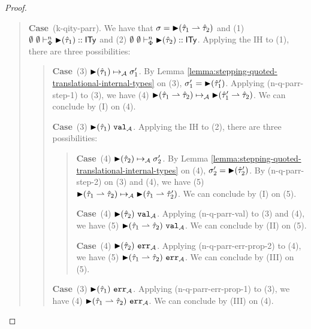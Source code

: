 \documentclass[12pt]{article}
\newcommand{\pfcase}[1]{\textbf{Case}~#1. }
\begin{document}
\begin{proof}
\begin{quote}
    \pfcase{(k-qity-parr)} We have that $\sigma={\blacktriangleright}(\hat{\tau}_1 \rightharpoonup \hat{\tau}_2)$ and (1) $\emptyset~\emptyset \vdash_{\Phi}^{n} {\blacktriangleright}(\hat{\tau}_1) :: {\sf ITy}$ and (2) $\emptyset~\emptyset \vdash_{\Phi}^{n} {\blacktriangleright}(\hat{\tau}_2) :: {\sf ITy}$. Applying the IH to (1), there are three possibilities:

    \begin{quote}
        \pfcase{(3) ${\blacktriangleright}(\hat{\tau}_1) \mapsto_{\mathcal{A}} \sigma_1'$} By Lemma \ref{lemma:stepping-quoted-translational-internal-types} on (3), $\sigma_1'={\blacktriangleright}(\hat{\tau}_1')$. Applying (n-q-parr-step-1) to (3), we have (4) ${\blacktriangleright}(\hat{\tau}_1 \rightharpoonup \hat{\tau}_2) \mapsto_{\mathcal{A}} {\blacktriangleright}(\hat{\tau}_1' \rightharpoonup \hat{\tau}_2)$. We can conclude by (I) on (4).

        \pfcase{(3) ${\blacktriangleright}(\hat{\tau}_1)~\mathtt{val}_{\mathcal{A}}$} Applying the IH to (2), there are three possibilities:

        \begin{quote}
            \pfcase{(4) ${\blacktriangleright}(\hat{\tau}_2) \mapsto_{\mathcal{A}} \sigma_2'$} By Lemma \ref{lemma:stepping-quoted-translational-internal-types} on (4), $\sigma_2'={\blacktriangleright}(\hat{\tau}_2')$. By (n-q-parr-step-2) on (3) and (4), we have (5) ${\blacktriangleright}(\hat{\tau}_1 \rightharpoonup \hat{\tau}_2) \mapsto_{\mathcal{A}} {\blacktriangleright}(\hat{\tau}_1 \rightharpoonup \hat{\tau}_2')$. We can conclude by (I) on (5).

            \pfcase{(4) ${\blacktriangleright}(\hat{\tau}_2)~\mathtt{val}_{\mathcal{A}}$} Applying (n-q-parr-val) to (3) and (4), we have (5) ${\blacktriangleright}(\hat{\tau}_1 \rightharpoonup \hat{\tau}_2)~\mathtt{val}_{\mathcal{A}}$. We can conclude by (II) on (5).

            \pfcase{(4) ${\blacktriangleright}(\hat{\tau}_2)~\mathtt{err}_{\mathcal{A}}$} Applying (n-q-parr-err-prop-2) to (4), we have (5) ${\blacktriangleright}(\hat{\tau}_1 \rightharpoonup \hat{\tau}_2)~\mathtt{err}_{\mathcal{A}}$. We can conclude by (III) on (5).
        \end{quote}

        \pfcase{(3) ${\blacktriangleright}(\hat{\tau}_1)~\mathtt{err}_{\mathcal{A}}$} Applying (n-q-parr-err-prop-1) to (3), we have (4) ${\blacktriangleright}(\hat{\tau}_1 \rightharpoonup \hat{\tau}_2)~\mathtt{err}_{\mathcal{A}}$. We can conclude by (III) on (4).
    \end{quote}
\end{quote}





\end{proof}
\end{document}
